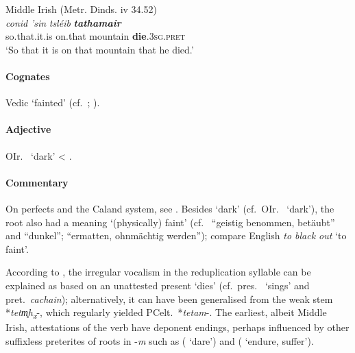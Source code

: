 \documentclass[output=paper,colorlinks,citecolor=brown]{langscibook}
\begin{document}
\begin{exe}
    \ex Middle Irish (Metr. Dinds. iv 34.52) \label{ex:Perfdark}\\
        \gll \textit{conid} \textit{’sin} \textit{tsléib} \textbf{\textit{tathamair}}  \\
        so.that.it.is on.that mountain \textbf{die}.\textsc{3sg.pret} \\
        \glt ‘So that it is on that mountain that he died.’\\
\end{exe}

\paragraph*{Cognates}

Vedic  ‘fainted’ (cf.\ ; ).

\paragraph*{Adjective}

OIr.\   ‘dark’ < .

\paragraph*{Commentary}

On perfects and the Caland system,  see \citet{Rau2013}. Besides ‘dark’ (cf.\ OIr.\   ‘dark’), the root also had a meaning ‘(physically) faint’ (cf.\  “geistig benommen, betäubt” and “dunkel”;  “ermatten, ohnmächtig werden”); compare English \textit{to black out} ‘to faint’.

According to \citet[634--635]{Schumacher2004}, the irregular vocalism in the reduplication syllable can be explained as based on an unattested present  ‘dies’ (cf.\ pres.\  ‘sings’ and pret.\ \textit{cachain}); alternatively, it can have been generalised from the weak stem *\textit{tetm̥h\textsubscript{x}}-, which regularly yielded PCelt.\ *\textit{tetam}-. The earliest, albeit Middle Irish, attestations of the verb have deponent endings, perhaps influenced by other suffixless preterites of roots in -\textit{m} such as   ( ‘dare’) and   ( ‘endure, suffer’).
\end{document}
